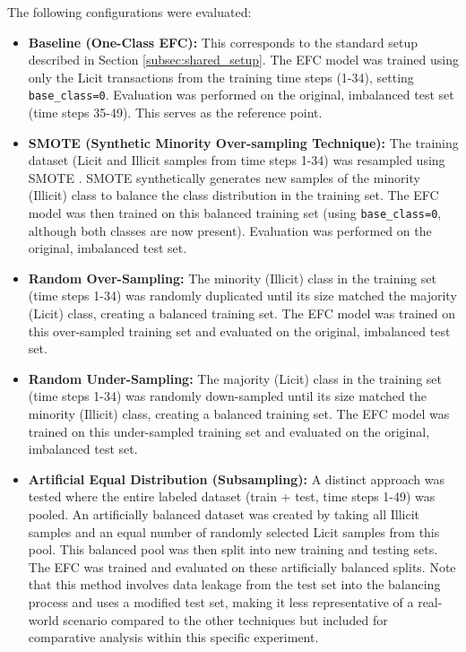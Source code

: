 \documentclass[12pt]{article}
\begin{document}
The following configurations were evaluated:

\begin{itemize}
    \item \textbf{Baseline (One-Class EFC):} This corresponds to the standard setup described in Section \ref{subsec:shared_setup}.
      The EFC model was trained using only the Licit transactions from the training time steps (1-34), setting
      \texttt{base\_class=0}. Evaluation was performed on the original, imbalanced test set (time steps 35-49). This serves
      as the reference point.

    \item \textbf{SMOTE (Synthetic Minority Over-sampling Technique):} The training dataset (Licit and Illicit samples
      from time steps 1-34) was resampled using SMOTE \cite{YourCitationKeyForSMOTE}. SMOTE synthetically generates new
      samples of the minority (Illicit) class to balance the class distribution in the training set. The EFC model was
      then trained on this balanced training set (using \texttt{base\_class=0}, although both classes are now present).
      Evaluation was performed on the original, imbalanced test set.

    \item \textbf{Random Over-Sampling:} The minority (Illicit) class in the training set (time steps 1-34) was randomly
      duplicated until its size matched the majority (Licit) class, creating a balanced training set. The EFC model was
      trained on this over-sampled training set and evaluated on the original, imbalanced test set.

    \item \textbf{Random Under-Sampling:} The majority (Licit) class in the training set (time steps 1-34) was randomly
      down-sampled until its size matched the minority (Illicit) class, creating a balanced training set. The EFC model was
      trained on this under-sampled training set and evaluated on the original, imbalanced test set.

    \item \textbf{Artificial Equal Distribution (Subsampling):} A distinct approach was tested where the entire labeled
      dataset (train + test, time steps 1-49) was pooled. An artificially balanced dataset was created by taking all Illicit
      samples and an equal number of randomly selected Licit samples from this pool. This balanced pool was then split into
      new training and testing sets. The EFC was trained and evaluated on these artificially balanced splits. Note that this
      method involves data leakage from the test set into the balancing process and uses a modified test set, making it less
      representative of a real-world scenario compared to the other techniques but included for comparative analysis within
      this specific experiment.
\end{itemize}
\end{document}

